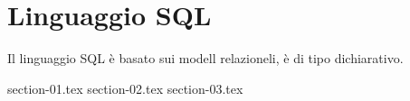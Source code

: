 \chapter{Linguaggio SQL}%
\label{cha:Linguaggio SQL}

Il linguaggio SQL è basato sui modell relazioneli, è di tipo dichiarativo.

{section-01.tex}
{section-02.tex}
{section-03.tex}
